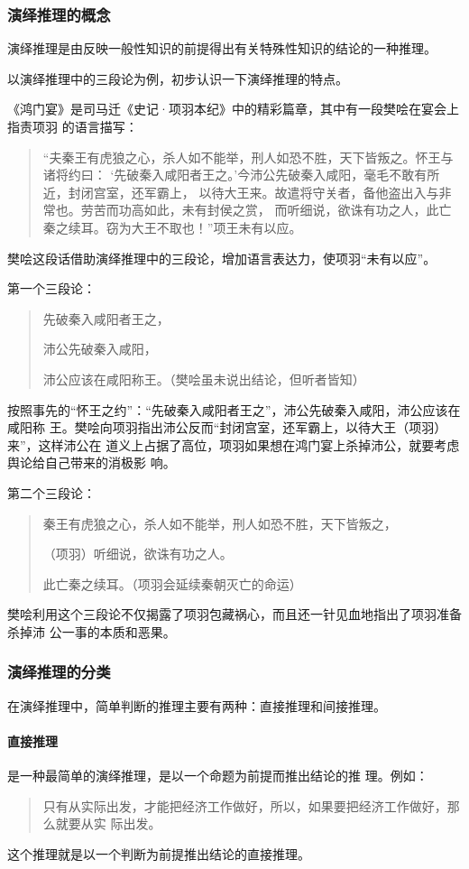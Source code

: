 \documentclass[final,oneside]{ctexbook}
\newenvironment{equotation}{\begin{quotation}\kaishu}{\end{quotation}}
\begin{document}
\subsubsection{演绎推理的概念}

演绎推理是由反映一般性知识的前提得出有关特殊性知识的结论的一种推理。

以演绎推理中的三段论为例，初步认识一下演绎推理的特点。

《鸿门宴》是司马迁《史记·项羽本纪》中的精彩篇章，其中有一段樊哙在宴会上指责项羽
的语言描写：
\begin{equotation}
  “夫秦王有虎狼之心，杀人如不能举，刑人如恐不胜，天下皆叛之。怀王与诸将约曰：
  ‘先破秦入咸阳者王之。’今沛公先破秦入咸阳，毫毛不敢有所近，封闭宫室，还军霸上，
  以待大王来。故遣将守关者，备他盗出入与非常也。劳苦而功高如此，未有封侯之赏，
  而听细说，欲诛有功之人，此亡秦之续耳。窃为大王不取也！”项王未有以应。
\end{equotation}
樊哙这段话借助演绎推理中的三段论，增加语言表达力，使项羽“未有以应”。

第一个三段论：
\begin{equotation}
  先破秦入咸阳者王之，

  沛公先破秦入咸阳，

  沛公应该在咸阳称王。（樊哙虽未说出结论，但听者皆知）
\end{equotation}
按照事先的“怀王之约”：“先破秦入咸阳者王之”，沛公先破秦入咸阳，沛公应该在咸阳称
王。樊哙向项羽指出沛公反而“封闭宫室，还军霸上，以待大王（项羽）来”，这样沛公在
道义上占据了高位，项羽如果想在鸿门宴上杀掉沛公，就要考虑舆论给自己带来的消极影
响。

第二个三段论：
\begin{equotation}
  秦王有虎狼之心，杀人如不能举，刑人如恐不胜，天下皆叛之，

  （项羽）听细说，欲诛有功之人。

  此亡秦之续耳。（项羽会延续秦朝灭亡的命运）
\end{equotation}
樊哙利用这个三段论不仅揭露了项羽包藏祸心，而且还一针见血地指出了项羽准备杀掉沛
公一事的本质和恶果。

\subsubsection{演绎推理的分类}

在演绎推理中，简单判断的推理主要有两种：直接推理和间接推理。

\paragraph{直接推理}是一种最简单的演绎推理，是以一个命题为前提而推出结论的推
理。例如：
\begin{equotation}
  只有从实际出发，才能把经济工作做好，所以，如果要把经济工作做好，那么就要从实
  际出发。
\end{equotation}
这个推理就是以一个判断为前提推出结论的直接推理。
\end{document}
